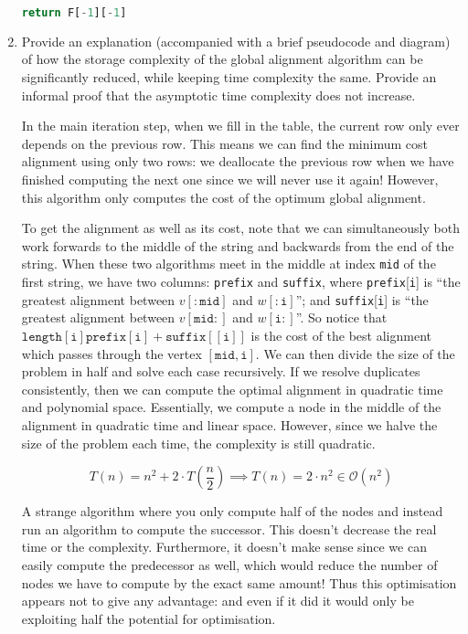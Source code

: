 \documentclass[10pt,\jkfside,a4paper]{article}
\begin{document}
\begin{enumerate}
\begin{lstlisting}[language=python]
    return F[-1][-1]

    \end{lstlisting}

    \item Provide an explanation (accompanied with a brief pseudocode and diagram) of how the storage complexity of the global alignment algorithm can be significantly reduced, while keeping time complexity the
    same. Provide an informal proof that the asymptotic time complexity does not increase.

    In the main iteration step, when we fill in the table, the current row only ever depends on the previous row. This means we can find the minimum cost alignment using only two rows: we deallocate the previous
    row when we have finished computing the next one since we will never use it again! However, this algorithm only computes the cost of the optimum global alignment.

    To get the alignment as well as its cost, note that we can simultaneously both work forwards to the middle of the string and backwards from the end of the string. When these two algorithms meet in the middle
    at index \texttt{mid} of the first string, we have two columns: \texttt{prefix} and \texttt{suffix}, where \texttt{prefix}[\texttt{i}] is ``the greatest alignment between $v[:\texttt{mid}]$ and
    $w[:\texttt{i}]$''; and \texttt{suffix}[\texttt{i}] is ``the greatest alignment between $v[\texttt{mid}:]$ and $w[\texttt{i}:]$''. So notice that $\texttt{length}[\texttt{i}]\texttt{prefix}[\texttt{i}] +
    \texttt{suffix}[[\texttt{i}]]$ is the cost of the best alignment which passes through the vertex $[\texttt{mid}, \texttt{i}]$. We can then divide the size of the problem in half and solve each case
    recursively. If we resolve duplicates consistently, then we can compute the optimal alignment in quadratic time and polynomial space. Essentially, we compute a node in the middle of the alignment in
    quadratic time and linear space. However, since we halve the size of the problem each time, the complexity is still quadratic.

    \[
        T(n) = n^2 + 2 \cdot T\left( \frac{n}{2} \right) \implies T(n) = 2 \cdot n^2 \in \mathcal O\left( n^2 \right)
    \]

    A strange algorithm where you only compute half of the nodes and instead run an algorithm to compute the successor. This doesn't decrease the real time or the complexity. Furthermore, it doesn't make sense
    since we can easily compute the predecessor as well, which would reduce the number of nodes we have to compute by the exact same amount! Thus this optimisation appears not to give any advantage: and even if
    it did it would only be exploiting half the potential for optimisation.


\end{enumerate}
\end{document}
